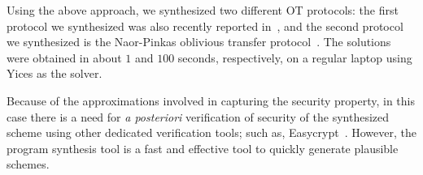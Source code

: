 \documentclass[preprint]{sig-alternate-05-2015}
\newtheorem{remark}{Remark}
\begin{document}
Using the above approach, we synthesized two different OT protocols:
the first protocol we synthesized was also recently reported in~\cite{SimpleOT},
and the second protocol we synthesized is the Naor-Pinkas oblivious transfer protocol~\cite{Pinkas}.
The solutions were obtained in about $1$ and $100$ seconds, respectively, 
on a regular laptop using Yices as the solver.

Because of the approximations involved in capturing the security
property, in this case
there is 
a need for {\em{a posteriori}} verification of security 
of the synthesized scheme using other dedicated verification tools; 
such as, Easycrypt~\cite{easycrypt}. 
However, the program synthesis tool is a fast and effective tool to 
quickly generate plausible schemes.






  
\end{document}
